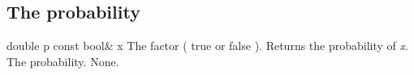 \vspace*{10mm}

\subsection{The probability}

\setConstInstance
\printMethodWithOneParam
{double}
{p}
{const bool\&}
{x}
{The factor ( true or false ).}
{Returns the probability of {\em x}.}
{The probability.}
{None.}





